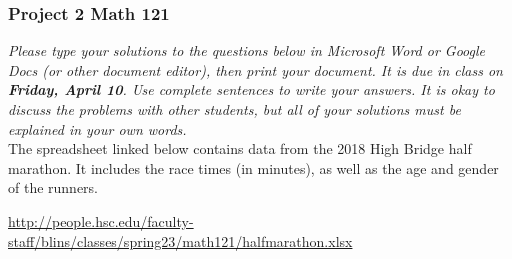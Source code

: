 \documentclass[12pt]{exam}
\begin{document}
\subsubsection*{Project 2 \hfill Math 121}

\textit{Please type your solutions to the questions below in Microsoft Word or Google Docs (or other document editor), then print your document. It is due in class on \textbf{Friday, April 10}. Use complete sentences to write your answers. It is okay to discuss the problems with other students, but all of your solutions must be explained in your own words. } \\

\noindent
The spreadsheet linked below contains data from the 2018 High Bridge half marathon. It includes the race times (in minutes), as well as the age and gender of the runners.  


\begin{center}
\url{http://people.hsc.edu/faculty-staff/blins/classes/spring23/math121/halfmarathon.xlsx}  
\end{center}
\end{document}
